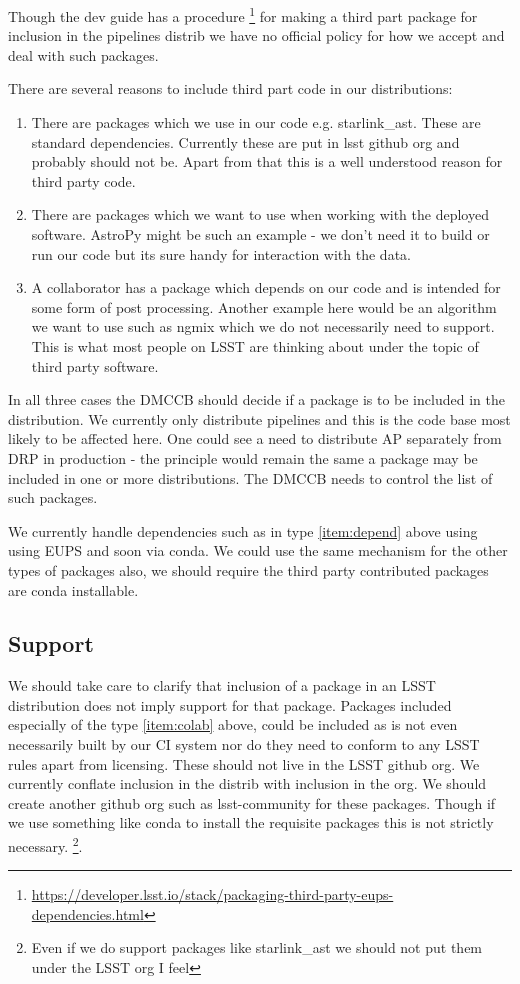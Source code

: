 

Though the dev guide has a procedure \footnote{\url{https://developer.lsst.io/stack/packaging-third-party-eups-dependencies.html}}
for making a third part package for inclusion in the pipelines distrib we have no official policy for how we accept and deal with such packages.



There are several reasons to include third part code in our distributions:
\begin{enumerate}
\item There are packages which we use in our code e.g. starlink\_ast.  These are standard dependencies.  Currently these are put in lsst github org and probably should not be. Apart from that this is a well understood reason for third party code. \label{item:depend}
\item There are packages which we want to use when working with the deployed software. AstroPy might be such an example - we don't need it to build or run our code but its sure handy for interaction with the data.\label{item:want}
\item A collaborator has a package which depends on our code and is intended for some form of post processing. Another example here would be an algorithm we want to use such as ngmix which we do not necessarily need to support. This is what most people on LSST are thinking about under the topic of third party software. \label{item:colab}
\end{enumerate}


In all three cases the DMCCB should decide if a package is to be included in the distribution. We currently only distribute pipelines and this is the code base most likely to be affected here. One could see a need to distribute AP separately from DRP in production - the principle would remain the same a package may be included in one or more distributions. The DMCCB needs to control the list of such packages.

We currently handle dependencies such as in type \ref{item:depend} above using using EUPS and soon via conda. We could use the same mechanism for the other types of packages also,
we should require the third party contributed packages are conda installable.

\subsection{Support}\label{sec:support}
We should take care to clarify that inclusion of a package in an LSST distribution does not imply support for that package.
Packages included especially of the type \ref{item:colab} above, could be included as is not even necessarily built by our CI system nor do they need to conform to any LSST rules apart from licensing.
These should not live in the LSST github org. We currently conflate inclusion in the distrib with inclusion in the org.
We should create another github org such as lsst-community for these packages. Though if we use something like conda to install the requisite packages this is not strictly necessary.
\footnote{Even if we do support packages like starlink\_ast we should not put them under the LSST org I feel}.

